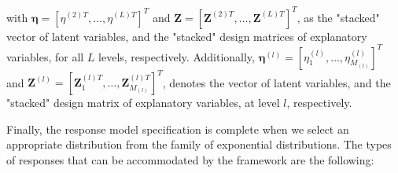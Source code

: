 \noindent with $\pmb{\eta}=\left[\eta^{(2)T}, \dots, \eta^{(L)T}\right]^{T}$ and $\mathbf{Z}=\left[\mathbf{Z}^{(2)T}, \dots, \mathbf{Z}^{(L)T}\right]^{T}$, as the "stacked" vector of latent variables, and the "stacked" design matrices of explanatory variables, for all $L$ levels, respectively. Additionally, $\pmb{\eta}^{(l)}=\left[\eta_{1}^{(l)}, \dots, \eta_{M_{(l)}}^{(l)}\right]^{T}$ and $\mathbf{Z}^{(l)}=\left[\mathbf{Z}_{1}^{(l)T}, \dots, \mathbf{Z}_{M_{(l)}}^{(l)T}\right]^{T}$, denotes the vector of latent variables, and the "stacked" design matrix of explanatory variables, at level $l$, respectively.

Finally, the response model specification is complete when we select an appropriate distribution from the family of exponential distributions. The types of responses that can be accommodated by the framework are the following:

